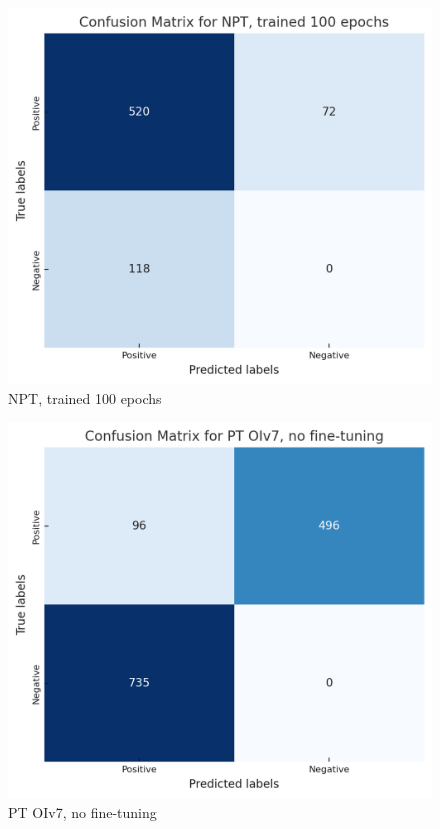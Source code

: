 \documentclass[10pt,twocolumn,letterpaper]{article}
\begin{document}
\begin{figure}[H]
    \centering
    \includegraphics[width=0.8\linewidth]{cmnpt100.png}
    \caption{NPT, trained 100 epochs}
    \label{fig:cmnpt100}
\end{figure}

\begin{figure}[H]
    \centering
    \includegraphics[width=0.8\linewidth]{cmptoiv7nft.png}
    \caption{PT OIv7, no fine-tuning}
    \label{fig:cmptoiv7nft}
\end{figure}
\end{document}
